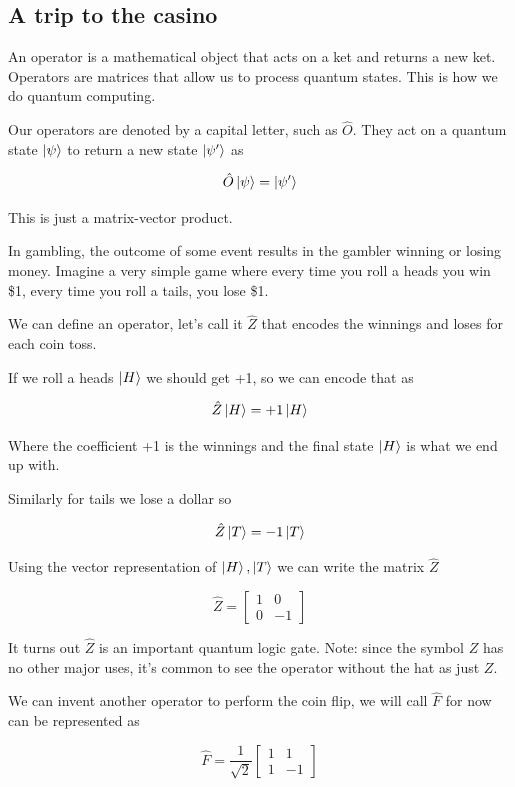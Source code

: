 \documentclass{book}
\begin{document}
\subsection{ A trip to the casino}

An operator is a mathematical object that acts on a ket and returns a new ket. Operators are matrices that allow us to process quantum states. This is how we do quantum computing. 

Our operators are denoted by a capital letter, such as  $\hat{O}$. They act on a quantum state $\ket{\psi}$ to return a new state $\ket{\psi'}$ as 

$$\hat{O}\ket{\psi} = \ket{\psi'}$$

This is just a matrix-vector product. 

In gambling, the outcome of some event results in the gambler winning or losing money. Imagine a very simple game where every time you roll a heads you win \$1, every time you roll a tails, you lose \$1. 

We can define an operator, let's call it $\hat{Z}$ that encodes the winnings and loses for each coin toss. 

If we roll a heads $\ket{H}$ we should get +1, so we can encode that as 

$$
\hat{Z}\ket{H} = +1 \ket{H}
$$

Where the coefficient +1 is the winnings and the final state $\ket{H}$ is what we end up with. 

Similarly for tails we lose a dollar so 

$$
\hat{Z}\ket{T} = -1 \ket{T}
$$

Using the vector representation of $\ket{H}, \ket{T}$ we can write the matrix $\hat{Z}$

$$ \hat{Z} = \begin{bmatrix} 1 & 0 \\ 0 & -1 \end{bmatrix} $$

It turns out $\hat{Z}$ is an important quantum logic gate. Note: since the symbol $Z$ has no other major uses, it's common to see the operator without the hat as just $Z$.


We can invent another operator to perform the coin flip, we will call $\hat{F}$ for now can be represented as 

$$
\hat{F} =  \frac{1}{\sqrt{2}} \begin{bmatrix} 1 & 1 \\ 1 & -1 \end{bmatrix}
$$
\end{document}
